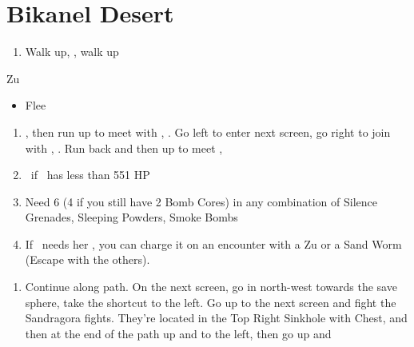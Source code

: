 \chapter{Bikanel Desert}

\begin{enumerate}
    \item Walk up, \sd, walk up
\end{enumerate}
\begin{battle}{Zu}
    \begin{itemize}
        \tidusf Attack
        \enemyf Attack
        \tidusf Equip Sonic Steel
        \tidusf Defend until \lulu\ shows up
        \auronf Defend until \lulu\ shows up
        \item Flee
    \end{itemize}
\end{battle}
\begin{enumerate}[resume]
    \item \sd, then run up to meet with \wakka, \sd. Go left to enter next screen, go right to join with \kimahri, \sd. Run back and then up to meet \rikku, \sd
    \item \save\ if \tidus\ has less than 551 HP
    \item Need 6 (4 if you still have 2 Bomb Cores) in any combination of Silence Grenades, Sleeping Powders, Smoke Bombs
    \item If \rikku\ needs her \od, you can charge it on an encounter with a Zu or a Sand Worm (Escape with the others).
\end{enumerate}
\begin{enumerate}[resume]
    \item Continue along path. On the next screen, go in north-west towards the save sphere, take the shortcut to the left. Go up to the next screen and fight the Sandragora fights. They're located in the Top Right Sinkhole with Chest, and then at the end of the path up and to the left, then go up and \sd
\end{enumerate}
\winvfill
